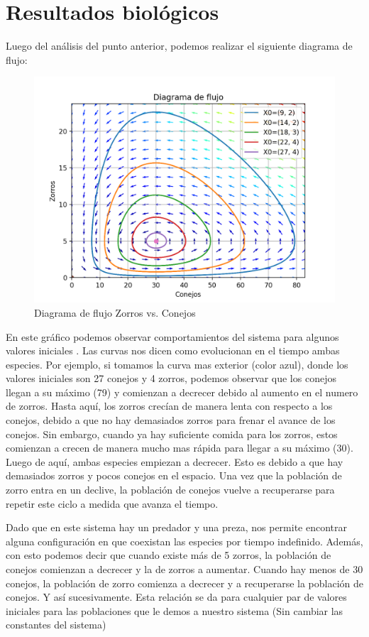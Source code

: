 \documentclass{article}
\begin{document}
\section{Resultados biológicos}
Luego del análisis del punto anterior, podemos realizar el siguiente diagrama de flujo:
\begin{figure}[H]
\centering
\includegraphics[width=\textwidth]{Figure_1.png}
\caption{Diagrama de flujo Zorros vs. Conejos}
\label{fig:Figure_1.png}
\end{figure}

En este gráfico podemos observar comportamientos del sistema para algunos valores iniciales . Las curvas nos dicen como evolucionan en el tiempo ambas especies. Por ejemplo, si tomamos la curva mas exterior (color azul), donde los valores iniciales son 27 conejos y 4 zorros,  podemos observar que los conejos llegan a su máximo (79) y comienzan a decrecer debido al aumento en el numero de zorros.
Hasta aquí, los zorros crecían de manera lenta con respecto a los conejos, debido a que no hay demasiados zorros para frenar el avance de los conejos. Sin embargo, cuando ya hay suficiente comida para los zorros, estos comienzan a crecen de manera mucho mas rápida para llegar a su máximo (30). Luego de aquí, ambas especies empiezan a decrecer. Esto es debido a que hay demasiados zorros y pocos conejos en el espacio. Una vez que la población de zorro entra en un declive, la población de conejos vuelve a recuperarse para repetir este ciclo a medida que avanza el tiempo.

Dado que en este sistema hay un predador y una preza, nos permite encontrar alguna configuración en que coexistan las especies por tiempo indefinido. 
Además, con esto podemos decir que cuando existe más de 5 zorros, la población de conejos comienzan a decrecer y la de zorros a aumentar. Cuando hay menos de 30 conejos, la población de zorro comienza a decrecer y a recuperarse la población de conejos. Y así sucesivamente. Esta relación se da para cualquier par de valores iniciales para las poblaciones que le demos a nuestro sistema (Sin cambiar las constantes del sistema)
\end{document}
